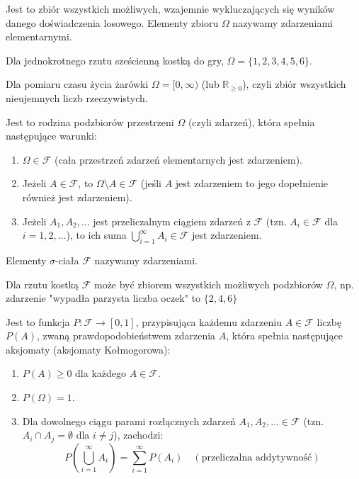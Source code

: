 \documentclass[final,a4paper,openany,12pt]{mwbk}
\begin{document}
\begin{Def} Jest to zbiór wszystkich możliwych, wzajemnie wykluczających się wyników danego doświadczenia losowego. Elementy zbioru $\Omega$ nazywamy zdarzeniami elementarnymi.
\end{Def}
\begin{Prz}
    Dla jednokrotnego rzutu sześcienną kostką do gry, $\Omega = \{1, 2, 3, 4, 5, 6\}$.
\end{Prz}
\begin{Prz}
    Dla pomiaru czasu życia żarówki $\Omega = [0, \infty)$ (lub $\mathbb{R}_{\ge 0}$), czyli zbiór wszystkich nieujemnych liczb rzeczywistych.
\end{Prz}


\begin{Def}
Jest to rodzina podzbiorów przestrzeni $\Omega$ (czyli zdarzeń), która spełnia następujące warunki:
    \begin{enumerate}
        \item $\Omega \in \mathcal{F}$ (cała przestrzeń zdarzeń elementarnych jest zdarzeniem).
        \item Jeżeli $A \in \mathcal{F}$, to $\Omega \setminus A \in \mathcal{F}$ (jeśli $A$ jest zdarzeniem to jego dopełnienie również jest zdarzeniem).
        \item Jeżeli $A_1, A_2, \dots$ jest przeliczalnym ciągiem zdarzeń z $\mathcal{F}$ (tzn. $A_i \in \mathcal{F}$ dla $i=1, 2, \dots$), to ich suma $\bigcup_{i=1}^{\infty} A_i \in \mathcal{F}$ jest zdarzeniem.
    \end{enumerate}
    Elementy $\sigma$-ciała $\mathcal{F}$ nazywamy zdarzeniami.
\end{Def}
\begin{Prz}
            Dla rzutu kostką $\mathcal{F}$ może być zbiorem wszystkich możliwych podzbiorów $\Omega$, np. zdarzenie "wypadła parzysta liczba oczek" to $\{2,4,6\}$
\end{Prz}

\begin{Def}
Jest to funkcja $P: \mathcal{F} \to [0, 1]$, przypisująca każdemu zdarzeniu $A \in \mathcal{F}$ liczbę $P(A)$, zwaną prawdopodobieństwem zdarzenia $A$, która spełnia następujące aksjomaty (aksjomaty Kołmogorowa):
\begin{enumerate}
    \item $P(A) \ge 0$ dla każdego $A \in \mathcal{F}$.
    \item $P(\Omega) = 1$.
    \item Dla dowolnego ciągu parami rozłącznych zdarzeń $A_1, A_2, \dots \in \mathcal{F}$ (tzn. $A_i \cap A_j = \emptyset$ dla $i \neq j$), zachodzi:
    $$P\left(\bigcup_{i=1}^{\infty} A_i\right) = \sum_{i=1}^{\infty} P(A_i) \quad (\text{przeliczalna addytywność})$$
\end{enumerate}
\end{Def}
\end{document}
